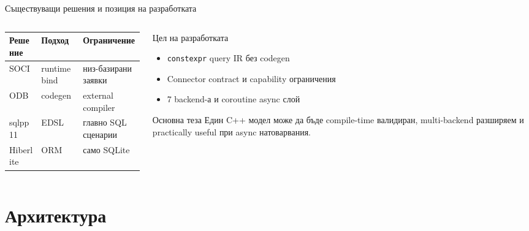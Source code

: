 \documentclass[aspectratio=169,12pt]{beamer}
\begin{document}
\begin{frame}{Съществуващи решения и позиция на разработката}
    \small
    \begin{columns}[T]
        \begin{column}{0.52\textwidth}
            \small
            \begin{tabularx}{\linewidth}{@{}llX@{}}
                \toprule
                \textbf{Решение} & \textbf{Подход} & \textbf{Ограничение}\\
                \midrule
                SOCI      & runtime bind & низ-базирани заявки\\
                ODB       & codegen      & external compiler\\
                sqlpp11   & EDSL         & главно SQL сценарии\\
                Hiberlite & ORM          & само SQLite\\
                \bottomrule
            \end{tabularx}
        \end{column}
        \begin{column}{0.45\textwidth}
            \begin{block}{Цел на разработката}
                \begin{itemize}\scriptsize
                    \setlength{\itemsep}{0.15em}
                    \item \texttt{constexpr} query IR без codegen
                    \item Connector contract и capability ограничения
                    \item 7 backend-а и coroutine async слой
                \end{itemize}
            \end{block}
            \begin{alertblock}{Основна теза}
                {\scriptsize Един C++ модел може да бъде compile-time валидиран,
                multi-backend разширяем и practically useful при async натоварвания.}
            \end{alertblock}
        \end{column}
    \end{columns}
\end{frame}

\section{Архитектура}
\end{document}
